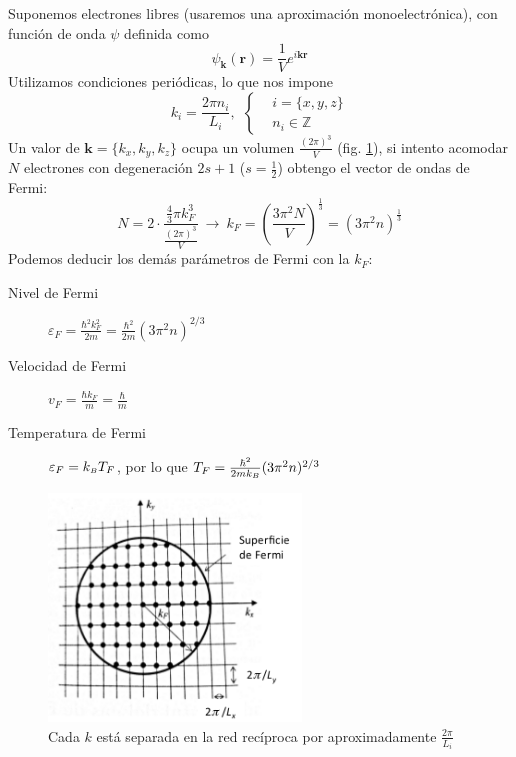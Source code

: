 Suponemos electrones libres (usaremos una aproximación
monoelectrónica), con función de onda $\psi$ definida como
\begin{equation}
  \psi _\mathbf{k} (\mathbf{r}) = \frac{1}{V} e^{i \mathbf{k}\mathbf{r}}
\end{equation}
Utilizamos condiciones periódicas, lo que nos impone
\begin{equation}
  k_i = \frac{2\pi n_i}{L_i}, \ \
  \begin{cases}
    &i = \{x,y,z\} \\
    &n_i \in \mathbb{Z}
  \end{cases}
\end{equation}
Un valor de $\mathbf{k} = \{k_x,k_y,k_z\}$ ocupa un volumen
$\frac{(2\pi)^3}{V}$ (fig. \ref{fig:sommk}), si intento acomodar $N$ electrones con
degeneración $2s+1$ ($s = \frac{1}{2}$) obtengo el vector de ondas de Fermi:
\begin{equation}
  N = 2 \cdot \frac{\frac{4}{3}\pi k_F^3}{\frac{(2\pi)^3}{V}} \
  \rightarrow \ k_F = \left( \frac{3\pi^2N}{V} \right)^\frac{1}{3} = \left( {3\pi^2n}\right)^\frac{1}{3}
\end{equation}
Podemos deducir los demás parámetros de Fermi con la $k_F$:
\begin{description}
\item[Nivel de Fermi] $ \varepsilon_F = \frac{\hbar^2 k_F^2}{2m}=
  \frac{\hbar^2}{2m}(3\pi^2 n)^{2/3}$
\item[Velocidad de Fermi] $v_F = \frac{\hbar k_F}{m} = \frac{\hbar}{m}$
\item[Temperatura de Fermi] $\varepsilon_F = k_{\scriptscriptstyle{B}}  T_F $, por lo que $T_F =
  \frac{\hbar^2}{2m k_{\scriptscriptstyle{B}} }(3\pi^2 n)^{2/3}$
\end{description}


\begin{figure}
  \centering
  \includegraphics[width=0.6\textwidth]{figures/sommk.png}
  \caption{Cada $k$ está separada en la red recíproca por
    aproximadamente $\frac{2\pi}{L_i}$}
  \label{fig:sommk}
\end{figure}

